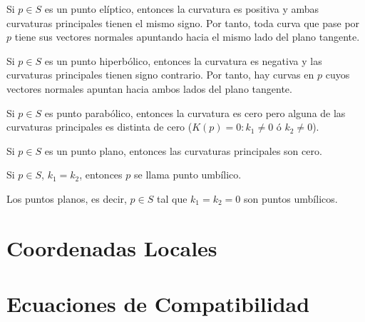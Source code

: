 \begin{obs}
  Si $p \in S$ es un punto elíptico, entonces la curvatura es positiva y ambas curvaturas principales tienen el mismo signo. Por tanto, toda curva que pase por $p$ tiene sus vectores normales apuntando hacia el mismo lado del plano tangente.
\end{obs}

\begin{obs}
  Si $p \in S$ es un punto hiperbólico, entonces la curvatura es negativa y las curvaturas principales tienen signo contrario. Por tanto, hay curvas en $p$ cuyos vectores normales apuntan hacia ambos lados del plano tangente.
\end{obs}

\begin{obs}
  Si $p \in S$ es punto parabólico, entonces la curvatura es cero pero alguna de las curvaturas principales es distinta de cero ($K(p) = 0 : k_1 \neq 0$ ó $k_2 \neq 0 $).
\end{obs}

\begin{obs}
  Si $p \in S$ es un punto plano, entonces las curvaturas principales son cero.
\end{obs}

\begin{defn}
  Si $p \in S$, $k_{1} = k_{2}$, entonces $p$ se llama punto umbílico.
\end{defn}

\begin{obs}
  Los puntos planos, es decir, $p \in S$ tal que $k_{1} = k_{2} = 0$ son puntos umbílicos.
\end{obs}

\section{Coordenadas Locales}

\section{Ecuaciones de Compatibilidad}
